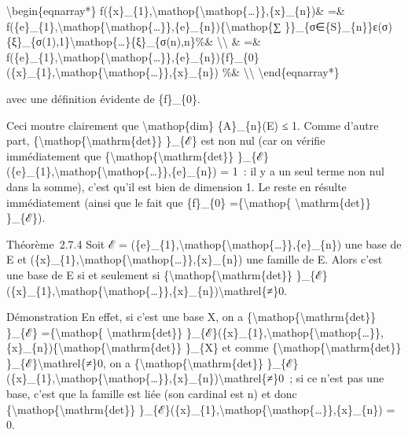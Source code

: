 \documentclass[]{article}
\begin{document}
\textbackslash{}begin\{eqnarray*\}
f(\{x\}\_\{1\},\textbackslash{}mathop\{\textbackslash{}mathop\{\ldots{}\}\},\{x\}\_\{n\})\&
=\&
f(\{e\}\_\{1\},\textbackslash{}mathop\{\textbackslash{}mathop\{\ldots{}\}\},\{e\}\_\{n\})\{\textbackslash{}mathop\{∑
\}\}\_\{σ∈\{S\}\_\{n\}\}ε(σ)\{ξ\}\_\{σ(1),1\}\textbackslash{}mathop\{\ldots{}\}\{ξ\}\_\{σ(n),n\}\%\&
\textbackslash{}\textbackslash{} \& =\&
f(\{e\}\_\{1\},\textbackslash{}mathop\{\textbackslash{}mathop\{\ldots{}\}\},\{e\}\_\{n\})\{f\}\_\{0\}(\{x\}\_\{1\},\textbackslash{}mathop\{\textbackslash{}mathop\{\ldots{}\}\},\{x\}\_\{n\})
\%\& \textbackslash{}\textbackslash{} \textbackslash{}end\{eqnarray*\}

avec une définition évidente de \{f\}\_\{0\}.

Ceci montre clairement que \textbackslash{}mathop\{dim\} \{A\}\_\{n\}(E)
≤ 1. Comme d'autre part,
\{\textbackslash{}mathop\{\textbackslash{}mathrm\{det\}\} \}\_\{ℰ\} est
non nul (car on vérifie immédiatement que
\{\textbackslash{}mathop\{\textbackslash{}mathrm\{det\}\}
\}\_\{ℰ\}(\{e\}\_\{1\},\textbackslash{}mathop\{\textbackslash{}mathop\{\ldots{}\}\},\{e\}\_\{n\})
= 1~: il y a un seul terme non nul dans la somme), c'est qu'il est bien
de dimension 1. Le reste en résulte immédiatement (ainsi que le fait que
\{f\}\_\{0\} =\{\textbackslash{}mathop\{ \textbackslash{}mathrm\{det\}\}
\}\_\{ℰ\}).

Théorème~2.7.4 Soit ℰ =
(\{e\}\_\{1\},\textbackslash{}mathop\{\textbackslash{}mathop\{\ldots{}\}\},\{e\}\_\{n\})
une base de E et
(\{x\}\_\{1\},\textbackslash{}mathop\{\textbackslash{}mathop\{\ldots{}\}\},\{x\}\_\{n\})
une famille de E. Alors c'est une base de E si et seulement si
\{\textbackslash{}mathop\{\textbackslash{}mathrm\{det\}\}
\}\_\{ℰ\}(\{x\}\_\{1\},\textbackslash{}mathop\{\textbackslash{}mathop\{\ldots{}\}\},\{x\}\_\{n\})\textbackslash{}mathrel\{≠\}0.

Démonstration En effet, si c'est une base X, on a
\{\textbackslash{}mathop\{\textbackslash{}mathrm\{det\}\} \}\_\{ℰ\}
=\{\textbackslash{}mathop\{ \textbackslash{}mathrm\{det\}\}
\}\_\{ℰ\}(\{x\}\_\{1\},\textbackslash{}mathop\{\textbackslash{}mathop\{\ldots{}\}\},\{x\}\_\{n\})\{\textbackslash{}mathop\{\textbackslash{}mathrm\{det\}\}
\}\_\{X\} et comme
\{\textbackslash{}mathop\{\textbackslash{}mathrm\{det\}\}
\}\_\{ℰ\}\textbackslash{}mathrel\{≠\}0, on a
\{\textbackslash{}mathop\{\textbackslash{}mathrm\{det\}\}
\}\_\{ℰ\}(\{x\}\_\{1\},\textbackslash{}mathop\{\textbackslash{}mathop\{\ldots{}\}\},\{x\}\_\{n\})\textbackslash{}mathrel\{≠\}0~;
si ce n'est pas une base, c'est que la famille est liée (son cardinal
est n) et donc \{\textbackslash{}mathop\{\textbackslash{}mathrm\{det\}\}
\}\_\{ℰ\}(\{x\}\_\{1\},\textbackslash{}mathop\{\textbackslash{}mathop\{\ldots{}\}\},\{x\}\_\{n\})
= 0.
\end{document}
